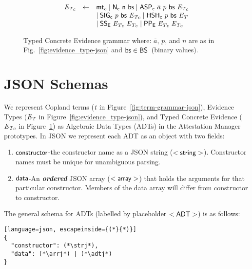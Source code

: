 \begin{figure}
  \[\begin{array}{rcl}
      \evt_{c}&\gets&\mtc_{c}\mid\Ntc{\nidt}{\bs}\mid\Utc{\bar{a}}{p}{\bs}{\evt_{c}}\\
              & & \mid\Gtc{p}{\bs}{\evt_{c}}\mid\Htc{p}{\bs}{\evt} \\
      & & \mid\SSt{\evt_{c}}{\evt_{c}}\mid\PPt{\evt_{c}}{\evt_{c}} %
      
    \end{array}\]
  \caption{Typed Concrete Evidence grammar where: \newline
     $\bar{a}$, $p$, and $n$ are as in Fig.~\ref{fig:evidence_type-json}
     and $\mathsf{bs}\in\mathsf{BS}$~(binary values).}
  \label{fig:concrete-ev-json}
\end{figure}

\newpage

\section{JSON Schemas}
We represent Copland terms ($\mathsf{\emph{t}}$ in
Figure~\ref{fig:term-grammar-json}), Evidence Types ($\mathsf{\emph{E}_\emph{T}}$ in
Figure~\ref{fig:evidence_type-json}), and Typed Concrete Evidence
($\mathsf{\emph{E}_\emph{T}}_{c}$ in Figure~\ref{fig:concrete-ev-json}) as Algebraic Data
Types (ADTs) in the Attestation Manager prototypes.  In JSON we
represent each ADT as an object with two fields:

\begin{enumerate}
  \item $\mathsf{constructor}$-the constructor name as a JSON
    string ($\mathsf{<string>}$).  Constructor names must be unique for unambiguous parsing.
  \item $\mathsf{data}$-An \textbf{\emph{ordered}} JSON array ($\mathsf{<array>}$) that holds
the arguments for that particular constructor.  Members of the data
array will differ from constructor to constructor.
\end{enumerate}

\noindent The general schema for ADTs (labelled by placeholder
$\mathsf{<ADT>}$) is as follows: \\

\begin{lstlisting}[language=json, escapeinside={(*}{*)}]
{
  "constructor": (*\strj*),
  "data": (*\arrj*) | (*\adtj*)
}
\end{lstlisting}

